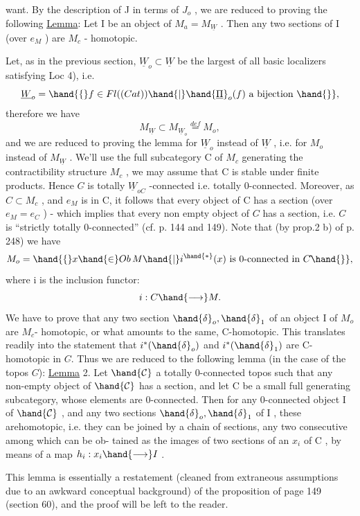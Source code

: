
want. By the description of J in terms of $J_o$ , we are reduced to proving
the following
\uline{Lemma}: Let I be an object of $M_a = M_{\underline{W}}$ . Then any two sections of I (over
$e_M$ ) are $M_c$ - homotopic.

Let, as in the previous section, $\underline{W}_o \subset \underline{W}$ be the largest of all basic
localizers satisfying Loc 4), i.e.
\[ \underline{W}_o = \hand{\{} f \in Fl((Cat)) \hand{|} \hand{\underline{\Pi}}_o(f) \text{ a bijection } \hand{\}} , \]
therefore we have
\[ M_{\underline{W}} \subset M_{\underline{W}_o} \overset{def}{=} M_o , \]
and we are reduced to proving the lemma for $\underline{W}_o$ instead of $\underline{W}$ , i.e. for $M_o$
instead of $M_{\underline{W}}$ . We'll use the full subcategory C of $M_c$ generating the
contractibility structure $M_c$ , we may assume that C is stable under finite
products. Hence $C\hat{}$ is totally $\underline{W}_{oC}$ -connected i.e. totally 0-connected.
Moreover, as $C \subset M_c$ ,  and $e_M$ is in C, it follows that every object
of C has a section (over $e_M = e_C$ ) - which implies that every non empty
object of $C\hat{}$ has a section, i.e. $C\hat{}$ is ``strictly totally 0-connected''
(cf. p. 144 and 149). Note that (by prop.2 b) of p. 248) we have
\[ M_o = \hand{\{} x \hand{\in} Ob\, M \hand{|} i^{\hand{*}}(x) \text{ is 0-connected in } C\hat{} \hand{\}} , \]
where i is the inclusion functor:
\[ i: C \hand{\longrightarrow} M . \]
We have to prove that any two section $\hand{\delta}_o,\hand{\delta}_1$ of an object I of $M_o$ are $M_c$-
homotopic, or what amounts to the same, C-homotopic. This translates
readily into the statement that $i^*(\hand{\delta}_o)$ and $i^*(\hand{\delta}_1)$ are C-homotopic in $C\hat{}$.
Thus we are reduced to the following lemma (in the case of the topos $C\hat{}$):
\uline{Lemma} 2. Let $\hand{\mathcal{C}}$ a totally 0-connected topos such that any non-empty object
of $\hand{\mathcal{C}}$ has a section, and let C be a small full generating subcategory,
whose elements are 0-connected. Then for any 0-connected object I of $\hand{\mathcal{C}}$ ,
and any two sections $\hand{\delta}_o,\hand{\delta}_1$ of I , these arehomotopic, i.e. they can be
joined by a chain of sections, any two consecutive among which can be ob-%
tained as the images of two sections of an  $x_i$ of C , by means of a
map $h_i : x_i \hand{\longrightarrow} I$ .

This lemma is essentially a restatement (cleaned from extraneous 
assumptions due to an awkward conceptual background) of the proposition of
page 149 (section 60), and the proof will be left to the reader.

